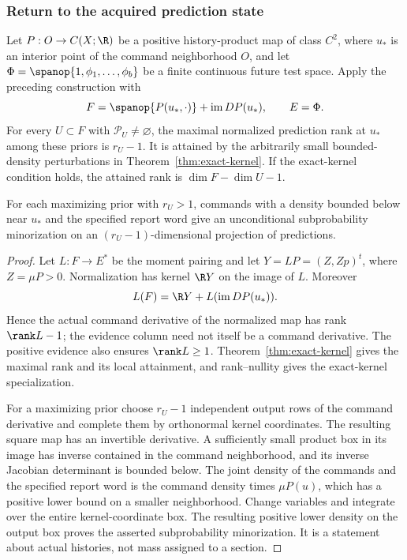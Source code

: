 \subsubsection{Return to the acquired prediction state}
\begin{corollary}
\label{cor:kernel-history-rank}
Let $P:O\to C(X;\R)$ be a positive history-product map of class $C^2$,
where $u_*$ is an interior point of the command neighborhood $O$, and let
$\Phi=\spanop\{1,\phi_1,\ldots,\phi_b\}$ be a finite continuous
future test space. Apply the preceding construction with
\[
 F=\spanop\{P(u_*,\cdot)\}+\operatorname{im}DP(u_*),\qquad E=\Phi.
\]
For every $U\subset F$ with $\mathcal P_U\ne\varnothing$, the maximal
normalized prediction rank at $u_*$ among these priors is $r_U-1$.
It is attained by the arbitrarily small bounded-density perturbations
in Theorem~\ref{thm:exact-kernel}. If the exact-kernel condition holds,
the attained rank is $\dim F-\dim U-1$.

For each maximizing prior with $r_U>1$, commands with a density
bounded below near $u_*$
and the specified report word give an unconditional subprobability
minorization on an $(r_U-1)$-dimensional projection of predictions.
\end{corollary}
\begin{proof}
Let $L:F\to E^*$ be the moment pairing and let
$Y=LP=(Z,Zp)^t$, where $Z=\mu P>0$. Normalization has kernel
$\R Y$ on the image of $L$. Moreover
\[
 L(F)=\R Y+L(\operatorname{im}DP(u_*)).
\]
Hence the actual command derivative of the normalized map has rank
$\rank L-1$; the evidence column need not itself be a command
derivative. The positive evidence also ensures $\rank L\ge1$.
Theorem~\ref{thm:exact-kernel} gives the maximal rank and its local
attainment, and rank--nullity gives the exact-kernel specialization.

For a maximizing prior choose $r_U-1$ independent output rows of the
command derivative and complete them by orthonormal kernel coordinates.
The resulting square map has an invertible derivative. A sufficiently
small product box in its image has inverse contained in the command
neighborhood, and its inverse Jacobian determinant is bounded below.
The joint density of the commands and the specified report word is the
command density times $\mu P(u)$, which has a positive lower bound on
a smaller neighborhood. Change variables and integrate over the entire
kernel-coordinate box. The resulting positive lower density on the
output box proves the asserted subprobability minorization. It is a
statement about actual histories, not mass assigned to a section.
\end{proof}

